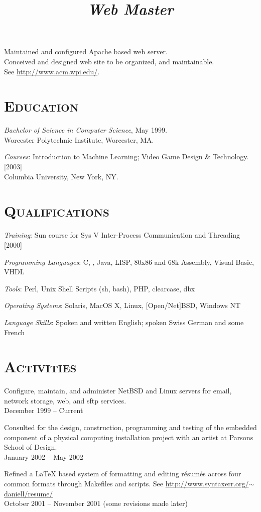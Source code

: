 \begin{resume}
\title{\emph{Web Master}}
\begin{position}
Maintained and configured Apache based web server.
\\
Conceived and designed web site to be organized, and maintainable.
\\
{\small{See \href{http://www.acm.wpi.edu/}{http://www.acm.wpi.edu/}.}}
\end{position}


\section{\textsc{Education}}
\emph{Bachelor of Science in Computer Science}, May 1999.\\
Worcester Polytechnic Institute, Worcester, MA.

\emph{Courses}: Introduction to Machine Learning; Video Game Design \& Technology. [2003]\\
Columbia University, New York, NY.

\section{\textsc{Qualifications}}
\emph{Training}: Sun course for Sys V Inter-Process Communication and Threading [2000]

\emph{Programming Languages}: C, \Cplusplus, Java, LISP, 80x86 and 68k Assembly, Visual Basic, VHDL

\emph{Tools}: Perl, Unix Shell Scripts (sh, bash), PHP, clearcase, dbx

\emph{Operating Systems}: Solaris, MacOS X, Linux, [Open/Net]BSD, Windows NT

\emph{Language Skills}:
Spoken and written English; spoken Swiss German and some French

\section{\textsc{Activities}}
Configure, maintain, and administer NetBSD and Linux servers for email, network storage, web, and sftp services.\\
December 1999 -- Current

Consulted for the design, construction, programming and testing
of the embedded component
of a physical computing installation project with an artist 
at Parsons School of Design.\\
January  2002 -- May 2002

Refined a \LaTeX{} based system of formatting and editing r\'esum\'es
across four common formats through Makefiles and scripts.
{\small{See \href{http://www.syntaxerr.org/~daniell/resume/}{http://www.syntaxerr.org/$\sim$daniell/resume/}}}\\
October 2001 -- November 2001 (some revisions made later)


\end{resume}

